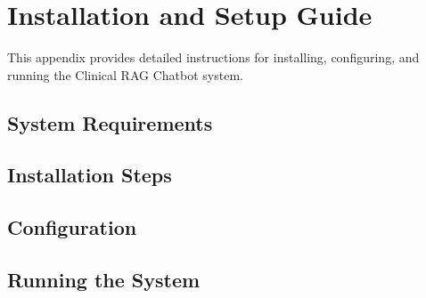 \chapter{Installation and Setup Guide}
\label{appendix:setup}

This appendix provides detailed instructions for installing, configuring, and running the Clinical RAG Chatbot system.

\section{System Requirements}


\section{Installation Steps}


\section{Configuration}


\section{Running the System}


\blindtext %
